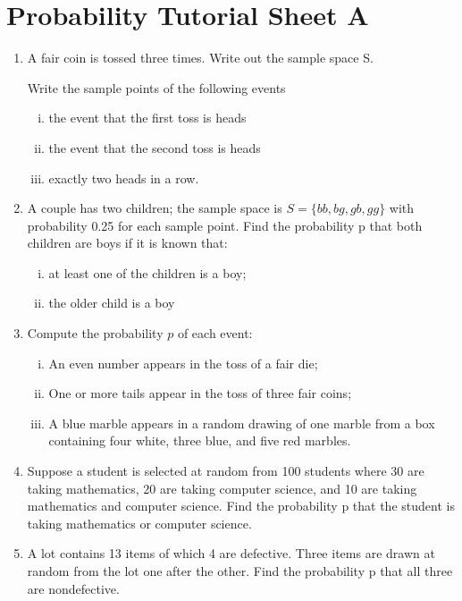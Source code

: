 \documentclass[a4paper,12pt]{article}
\begin{document}
\section*{Probability Tutorial Sheet A}
\begin{enumerate}
    \item 
A fair coin is tossed three times. Write out the sample space S.

Write the sample points of the following events

\begin{enumerate}[(i)]
\item the event that the first toss is heads
\item the event that the second toss is heads
\item exactly two heads in a row.
\end{enumerate}


\item 
A couple has two children; the sample space is $S = \{bb, bg, gb, gg\}$ with probability 0.25 for each sample point. Find the probability p that both children are boys if it is known that: 
\begin{enumerate}[(i)]
\item at least one of the children is a boy;
\item  the older child is a boy
\end{enumerate}

\item 
Compute the probability $p$ of each event:
\begin{enumerate}[(i)]
\item An even number appears in the toss of a fair die;
\item One or more tails appear in the toss of three fair coins;
\item A blue marble appears in a random drawing of one marble from a box containing four white, three blue, and five red marbles.
\end{enumerate}

\item 
Suppose a student is selected at random from 100 students where 30 are taking mathematics, 20 are taking computer science, and 10 are taking mathematics and computer science. Find the probability p that the student is taking mathematics or computer science.
\item 
A lot contains 13 items of which 4 are defective. Three items are drawn at random from the lot one after the other. Find the probability p that all three are nondefective.

\end{enumerate}
\end{document}

